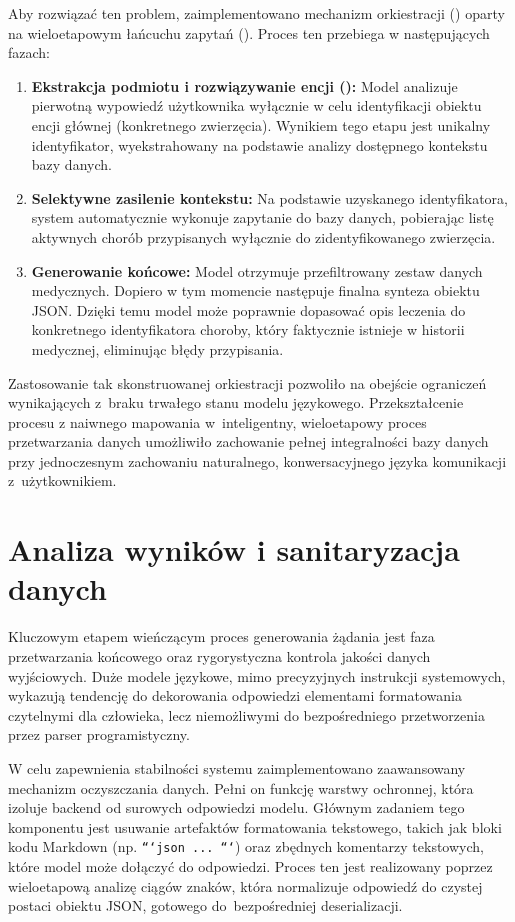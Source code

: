 Aby rozwiązać ten problem, zaimplementowano mechanizm orkiestracji () oparty na wieloetapowym łańcuchu zapytań (). Proces ten przebiega w następujących fazach:
\begin{enumerate}
    \item \textbf{Ekstrakcja podmiotu i rozwiązywanie encji ():} Model analizuje pierwotną wypowiedź użytkownika wyłącznie w celu identyfikacji obiektu encji głównej (konkretnego zwierzęcia). Wynikiem tego etapu jest unikalny identyfikator, wyekstrahowany na podstawie analizy dostępnego kontekstu bazy danych.
    \item \textbf{Selektywne zasilenie kontekstu:} Na podstawie uzyskanego identyfikatora, system automatycznie wykonuje zapytanie do bazy danych, pobierając listę aktywnych chorób przypisanych wyłącznie do zidentyfikowanego zwierzęcia.
    \item \textbf{Generowanie końcowe:} Model otrzymuje przefiltrowany zestaw danych medycznych. Dopiero w tym momencie następuje finalna synteza obiektu JSON. Dzięki temu model może poprawnie dopasować opis leczenia do konkretnego identyfikatora choroby, który faktycznie istnieje w historii medycznej, eliminując błędy przypisania.
\end{enumerate}

Zastosowanie tak skonstruowanej orkiestracji pozwoliło na obejście ograniczeń wynikających z~braku trwałego stanu modelu językowego. Przekształcenie procesu z naiwnego mapowania w~inteligentny, wieloetapowy proces przetwarzania danych umożliwiło zachowanie pełnej integralności bazy danych przy jednoczesnym zachowaniu naturalnego, konwersacyjnego języka komunikacji z~użytkownikiem.


\section{Analiza wyników i sanitaryzacja danych}

Kluczowym etapem wieńczącym proces generowania żądania jest faza przetwarzania końcowego oraz rygorystyczna kontrola jakości danych wyjściowych. Duże modele językowe, mimo precyzyjnych instrukcji systemowych, wykazują tendencję do dekorowania odpowiedzi elementami formatowania czytelnymi dla człowieka, lecz niemożliwymi do bezpośredniego przetworzenia przez parser programistyczny.

W celu zapewnienia stabilności systemu zaimplementowano zaawansowany mechanizm oczyszczania danych. Pełni on funkcję warstwy ochronnej, która izoluje backend od surowych odpowiedzi modelu. Głównym zadaniem tego komponentu jest usuwanie artefaktów formatowania tekstowego, takich jak bloki kodu Markdown (np. \texttt{```json ... ```}) oraz zbędnych komentarzy tekstowych, które model może dołączyć do odpowiedzi. Proces ten jest realizowany poprzez wieloetapową analizę ciągów znaków, która normalizuje odpowiedź do czystej postaci obiektu JSON, gotowego do~bezpośredniej deserializacji. %

